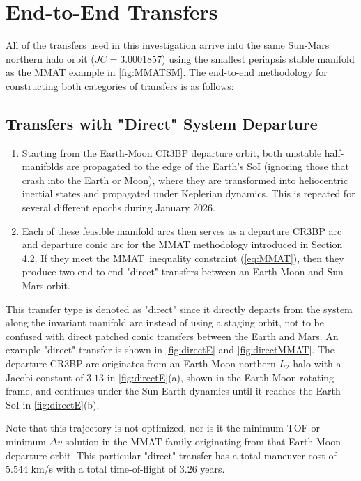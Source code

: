 \section{End-to-End Transfers}
All of the transfers used in this investigation arrive into the same Sun-Mars northern halo orbit
($JC=3.0001857$) using the smallest periapsis stable manifold as the MMAT example in
\cref{fig:MMATSM}. The end-to-end methodology for constructing both categories of transfers is as
follows:

\subsection{Transfers with "Direct" System Departure}
\begin{enumerate}
    \item   Starting from the Earth-Moon CR3BP departure orbit, both unstable half-manifolds are
            propagated to the edge of the Earth's SoI (ignoring those that crash into the Earth or
            Moon), where they are transformed into heliocentric inertial states and propagated
            under Keplerian dynamics. This is repeated for several different epochs during January
            2026.
    \item   Each of these feasible manifold arcs then serves as a departure CR3BP arc and departure
            conic arc for the MMAT methodology introduced in Section 4.2. If they meet the MMAT\
            inequality constraint (\cref{eq:MMAT}), then they produce two end-to-end "direct"
            transfers between an Earth-Moon and Sun-Mars orbit.
\end{enumerate}

This transfer type is denoted as "direct" since it directly departs from the system along the
invariant manifold arc instead of using a staging orbit, not to be confused with direct patched
conic transfers between the Earth and Mars. An example "direct" transfer is shown in
\cref{fig:directE} and \cref{fig:directMMAT}. The departure CR3BP arc originates from an Earth-Moon
northern $L_{2}$ halo with a Jacobi constant of $3.13$ in \cref{fig:directE}(a), shown in the
Earth-Moon rotating frame, and continues under the Sun-Earth dynamics until it reaches the Earth
SoI in \cref{fig:directE}(b).

Note that this trajectory is not optimized, nor is it the minimum-TOF or minimum-$\Delta v$
solution in the MMAT family originating from that Earth-Moon departure orbit. This particular
"direct" transfer has a total maneuver cost of $5.544$ km/s with a total time-of-flight of $3.26$
years.

